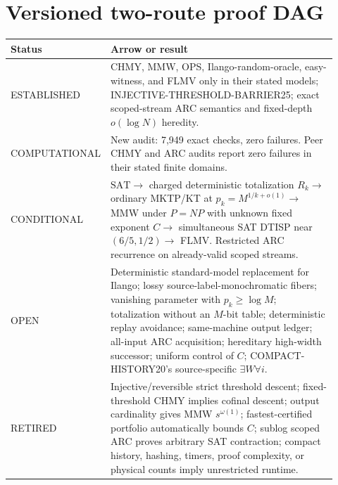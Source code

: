 \documentclass[11pt]{article}
\begin{document}
\section*{Versioned two-route proof DAG}
\begin{center}
\begin{tabular}{p{0.17\linewidth}p{0.75\linewidth}}
\toprule
Status & Arrow or result\\
\midrule
ESTABLISHED & CHMY, MMW, OPS, Ilango-random-oracle, easy-witness, and FLMV only in their stated models; INJECTIVE-THRESHOLD-BARRIER25; exact scoped-stream ARC semantics and fixed-depth $o(\log N)$ heredity.\\
COMPUTATIONAL & New audit: 7,949 exact checks, zero failures. Peer CHMY and ARC audits report zero failures in their stated finite domains.\\
CONDITIONAL & $\mathrm{SAT}\to$ charged deterministic totalization $R_k\to$ ordinary MKTP/KT at $p_k=M^{1/k+o(1)}\to$ MMW under $P=NP$ with unknown fixed exponent $C\to$ simultaneous SAT DTISP near $(6/5,1/2)\to$ FLMV. Restricted ARC recurrence on already-valid scoped streams.\\
OPEN & Deterministic standard-model replacement for Ilango; lossy source-label-monochromatic fibers; vanishing parameter with $p_k\geq\log M$; totalization without an $M$-bit table; deterministic replay avoidance; same-machine output ledger; all-input ARC acquisition; hereditary high-width successor; uniform control of $C$; COMPACT-HISTORY20's source-specific $\exists W\forall i$.\\
RETIRED & Injective/reversible strict threshold descent; fixed-threshold CHMY implies cofinal descent; output cardinality gives MMW $s^{\omega(1)}$; fastest-certified portfolio automatically bounds $C$; sublog scoped ARC proves arbitrary SAT contraction; compact history, hashing, timers, proof complexity, or physical counts imply unrestricted runtime.\\
\bottomrule
\end{tabular}
\end{center}
\end{document}
